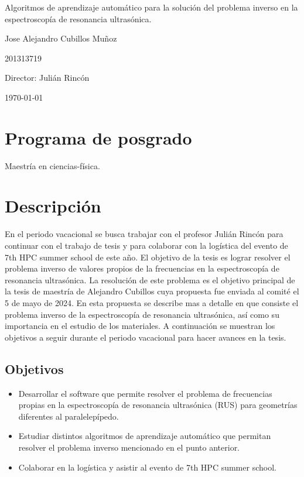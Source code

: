 \documentclass[12pt]{article}
\begin{document}
\begin{center}
\Huge
Algoritmos de aprendizaje automático para la solución del problema inverso en la espectroscopía de resonancia ultrasónica. 

\vspace{3mm}
\Large Jose Alejandro Cubillos Muñoz

\large
201313719


\vspace{2mm}
\Large
Director: Julián Rincón

\normalsize
\vspace{2mm}

\today
\end{center}


\normalsize

\section{Programa de posgrado}
Maestría en ciencias-física.
\section{Descripción}

En el periodo vacacional se busca trabajar con el profesor Julián Rincón para continuar con el trabajo de tesis y para colaborar con la logística del evento de 7th HPC summer school de este año. El objetivo de la tesis es lograr resolver el problema inverso de valores propios de la frecuencias en la espectroscopía de resonancia ultrasónica. La resolución de este problema es el objetivo principal de la tesis de maestría de Alejandro Cubillos cuya propuesta fue enviada al comité el 5 de mayo de 2024. En esta propuesta se describe mas a detalle en que consiste el problema inverso de la espectroscopía de resonancia ultrasónica, así como su importancia en el estudio de los materiales. A continuación se muestran los objetivos a seguir durante el periodo vacacional para hacer avances en la tesis. 


\subsection{Objetivos}
\begin{itemize}
    \item Desarrollar el software que permite resolver el problema de frecuencias propias en la espectroscopía de resonancia ultrasónica (RUS) para geometrías diferentes al paralelepípedo.
    \item Estudiar distintos algoritmos de aprendizaje automático que permitan resolver el problema inverso mencionado en el punto anterior. 
    \item Colaborar en la logística y asistir al evento de 7th HPC summer school. 
\end{itemize}
\end{document}
